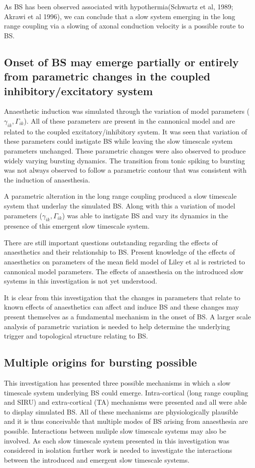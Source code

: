 \documentclass[a4paper,12pt]{article}
\begin{document}
As BS has been observed associated with hypothermia(Schwartz et al, 1989; Akrawi et al 1996), we can conclude that  a slow system emerging in the long range coupling via a slowing of axonal conduction velocity is a possible route
to BS.

\subsection{Onset of BS may emerge partially or entirely from parametric changes in the coupled inhibitory/excitatory system}
Anaesthetic induction was simulated through the variation of model parameters ($\gamma_{ik}, \Gamma_{ik}$). All of these parameters are present in the cannonical model and are related to the coupled excitatory/inhibitory system. It was seen that variation of these parameters could instigate BS while leaving the slow timescale system parameters unchanged. These parametric changes were also observed to produce widely varying bursting dynamics. The transition from tonic spiking to bursting was not always observed to follow a parametric contour that was consistent with the induction of anaesthesia.

A parametric alteration in the long range coupling produced a slow timescale system that underlay the simulated BS. Along with this a variation of model parameters ($\gamma_{ik}, \Gamma_{ik}$) was able to instigate BS and vary its dynamics in the presence of this emergent slow timescale system.

There are still important questions outstanding regarding the effects of anaesthetics and their relationship to BS. Present knowledge of the effects of anaesthetics on parameters of the mean field model of Liley et al is restricted to cannonical model parameters. The effects of anaesthesia on the introduced slow systems in this investigation is not yet understood. 

It is clear from this investigation that the changes in parameters that relate to known effects of anaesthetics can affect and induce BS and these changes may present themselves as a fundamental mechanism in the onset of BS. A larger scale analysis of parametric variation is needed to help determine the underlying trigger and topological structure relating to BS.

\subsection{Multiple origins for bursting possible}
This investigation has presented three possible mechanisms in which a slow timescale system underlying BS could emerge. Intra-cortical (long range coupling and SIRU) and extra-cortical (TA) mechanisms were presented and all were able to display simulated BS. All of these mechanisms are physiologically plausible and it is thus conceivable that multiple modes of BS arising from anaesthesia are possible. Interactions between muliple slow timescale systems may also be involved. As each slow timescale system presented in this investigation was considered in isolation further work is needed to investigate the interactions between the introduced and emergent slow timescale systems.
\end{document}
